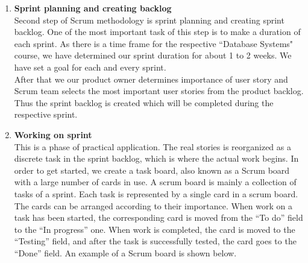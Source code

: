 \begin{enumerate}

\item \textbf{Sprint planning and creating backlog}\\

Second step of Scrum methodology is sprint planning and creating sprint backlog. One of the most important task of this step is to make a duration of each sprint. As there is a time frame for the respective ``Database Systems" course, we have determined our sprint duration for about 1 to 2 weeks. We have set a goal for each and every sprint.\\
After that we our product owner determines importance of user story and Scrum team selects the most important user stories from the product backlog. Thus the sprint backlog is created which will be completed during the respective sprint.

\item \textbf{Working on sprint}\\

This is a phase of practical application. The real stories is reorganized as a discrete task in the sprint backlog, which is where the actual work begins. In order to get started, we create a task board, also known as a Scrum board with a large number of cards in use. A scrum board is mainly a collection of tasks of a sprint. Each task is represented by a single card in a scrum board. The cards can be arranged according to their importance. When work on a task has been started, the corresponding card is moved from the “To do” field to the “In progress” one. When work is completed, the card is moved to the “Testing” field, and after the task is successfully tested, the card goes to the “Done” field. An example of a Scrum board is shown below.


\end{enumerate}
